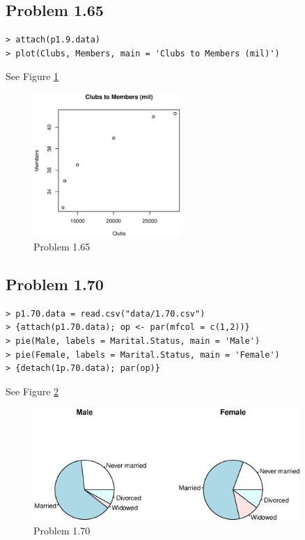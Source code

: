 \subsection{Problem 1.65}
\begin{lstlisting}
> attach(p1.9.data)
> plot(Clubs, Members, main = 'Clubs to Members (mil)')
\end{lstlisting}
	See Figure \ref{p1.65}
	\begin{figure}[!htb]
	  \centering
	  \includegraphics[width=0.5\textwidth]{p1.65.eps}
	  \caption{Problem 1.65 \label{p1.65}}
	\end{figure}

\subsection{Problem 1.70}
\begin{lstlisting}
> p1.70.data = read.csv("data/1.70.csv")
> {attach(p1.70.data); op <- par(mfcol = c(1,2))}
> pie(Male, labels = Marital.Status, main = 'Male')
> pie(Female, labels = Marital.Status, main = 'Female')
> {detach(1p.70.data); par(op)}
\end{lstlisting}
	See Figure \ref{p1.70}
	\begin{figure}[!htb]
	  \centering
	  \includegraphics[width=0.9\textwidth]{p1.70.eps}
	  \caption{Problem 1.70 \label{p1.70}}
	\end{figure}

\clearpage